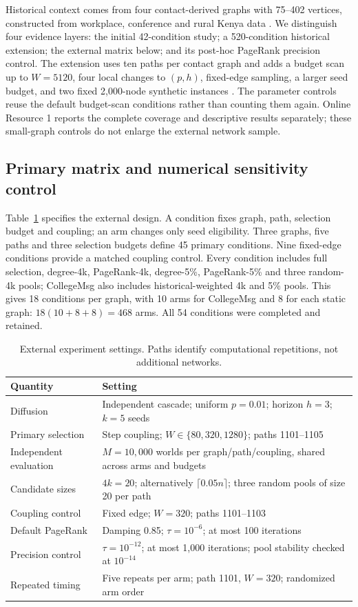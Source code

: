 \documentclass[smallextended]{svjour3}
\begin{document}
Historical context comes from four contact-derived graphs with 75--402 vertices, constructed from workplace, conference and rural Kenya data \cite{ref3,ref4,ref5,ref6}. We distinguish four evidence layers: the initial 42-condition study; a 520-condition historical extension; the external matrix below; and its post-hoc PageRank precision control. The extension uses ten paths per contact graph and adds a budget scan up to $W=5120$, four local changes to $(p,h)$, fixed-edge sampling, a larger seed budget, and two fixed 2,000-node synthetic instances \cite{ref17,ref18}. The parameter controls reuse the default budget-scan conditions rather than counting them again. Online Resource 1 reports the complete coverage and descriptive results separately; these small-graph controls do not enlarge the external network sample.

\subsection{Primary matrix and numerical sensitivity control}
Table~\ref{tab:settings} specifies the external design. A condition fixes graph, path, selection budget and coupling; an arm changes only seed eligibility. Three graphs, five paths and three selection budgets define 45 primary conditions. Nine fixed-edge conditions provide a matched coupling control. Every condition includes full selection, degree-4k, PageRank-4k, degree-5\%, PageRank-5\% and three random-4k pools; CollegeMsg also includes historical-weighted 4k and 5\% pools. This gives 18 conditions per graph, with 10 arms for CollegeMsg and 8 for each static graph: $18(10+8+8)=468$ arms. All 54 conditions were completed and retained.

\begin{table}[htbp]
\caption{External experiment settings. Paths identify computational repetitions, not additional networks.}\label{tab:settings}
\begin{tabularx}{\linewidth}{lX}
\toprule
Quantity & Setting \\
\midrule
Diffusion & Independent cascade; uniform $p=0.01$; horizon $h=3$; $k=5$ seeds \\
Primary selection & Step coupling; $W\in\{80,320,1280\}$; paths 1101--1105 \\
Independent evaluation & $M=10,000$ worlds per graph/path/coupling, shared across arms and budgets \\
Candidate sizes & $4k=20$; alternatively $\lceil0.05n\rceil$; three random pools of size 20 per path \\
Coupling control & Fixed edge; $W=320$; paths 1101--1103 \\
Default PageRank & Damping 0.85; $\tau=10^{-6}$; at most 100 iterations \\
Precision control & $\tau=10^{-12}$; at most 1,000 iterations; pool stability checked at $10^{-14}$ \\
Repeated timing & Five repeats per arm; path 1101, $W=320$; randomized arm order \\
\bottomrule
\end{tabularx}
\end{table}
\end{document}

